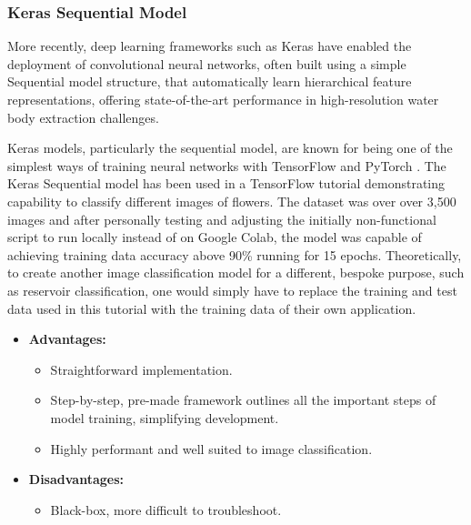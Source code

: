 \subsubsection{Keras Sequential Model}
More recently, deep learning frameworks such as Keras have enabled the deployment of convolutional neural networks, often built using a simple Sequential model structure, that automatically learn hierarchical feature representations, offering state-of-the-art performance in high-resolution water body extraction challenges. 

Keras models, particularly the sequential model, are known for being one of the simplest ways of training neural networks with TensorFlow \citep{keras-team_2015} and PyTorch \citep{pytorch_2023}. The Keras Sequential model has been used in a TensorFlow tutorial demonstrating capability to classify different images of flowers. The dataset was over over 3,500 images \citep{tensorflow_2018} and after personally testing and adjusting the initially non-functional script to run locally instead of on Google Colab, the model was capable of achieving training data accuracy above 90\% running for 15 epochs. Theoretically, to create another image classification model for a different, bespoke purpose, such as reservoir classification, one would simply have to replace the training and test data used in this tutorial with the training data of their own application. 

\begin{itemize}
    \item \textbf{Advantages:}
    \begin{itemize}
        \item Straightforward implementation.
        \item Step-by-step, pre-made framework outlines all the important steps of model training, simplifying development. 
        \item Highly performant and well suited to image classification. 
    \end{itemize}
    \item \textbf{Disadvantages:}
    \begin{itemize}
        \item Black-box, more difficult to troubleshoot. 
    \end{itemize}
\end{itemize}

